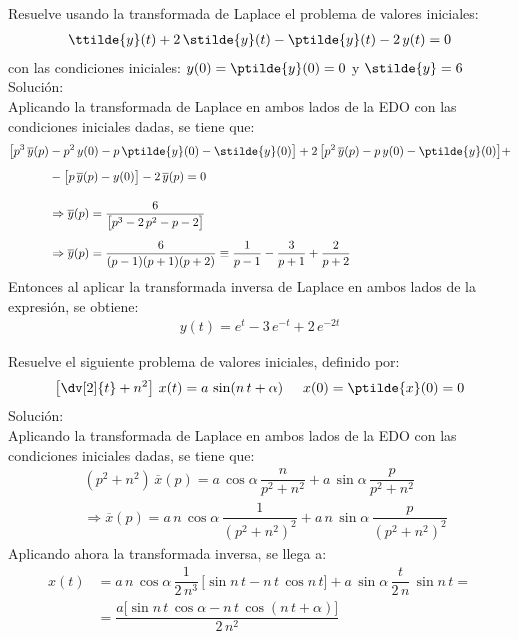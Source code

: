 \begin{ejemplo}
Resuelve usando la transformada de Laplace el problema de valores iniciales:
\begin{align*}
\ttilde{y}(t) +  2 \, \stilde{y} (t) - \ptilde{y}(t) - 2 \, y(t) = 0
\end{align*}
con las condiciones iniciales: $y(0) = \ptilde{y}(0) = 0$ y $\stilde{y} = 6$
\noindent Solución:
\\[0.5em]
Aplicando la transformada de Laplace en ambos lados de la EDO con las condiciones iniciales dadas, se tiene que:
\begin{align*}
\big[p^{3} \, \overline{y}(p) &- p^{2} \, y(0) - p \, \ptilde{y}(0) - \stilde{y}(0) \big] + 2 \, \big[p^{2} \, \overline{y}(p) - p \, y(0) - \ptilde{y}(0) \big] + \\[0.5em]
&- \big[p \, \overline{y}(p) - y(0) \big] - 2 \, \overline{y}(p) = 0 \\[1em]
&\Rightarrow \overline{y}(p) = \dfrac{6}{\big[p^{3} - 2 \, p^{2} - p -2 \big]} \\[0.5em]
&\Rightarrow \overline{y}(p) = \dfrac{6}{(p - 1)(p + 1)(p +2)} \equiv \dfrac{1}{p - 1} - \dfrac{3}{p + 1} + \dfrac{2}{p + 2}  
\end{align*}
Entonces al aplicar la transformada inversa de Laplace en ambos lados de la expresión, se obtiene:
\begin{align*}
y(t) = e^{t} - 3 \, e^{-t} + 2 \, e^{- 2 t}
\end{align*}
\end{ejemplo}
\begin{ejemplo}
Resuelve el siguiente problema de valores iniciales, definido por:
\begin{align*}
\left[ \dv[2]{t} + n^{2}\right] \, x(t) = a \, \sin (n \, t +  \alpha) \hspace{0.5cm} x(0) = \ptilde{x}(0) = 0
\end{align*}
\noindent Solución:
\\[0.5em]
Aplicando la transformada de Laplace en ambos lados de la EDO con las condiciones iniciales dadas, se tiene que:
\begin{align*}
&(p^{2} + n^{2}) \, \overline{x}(p) = a \, \cos \alpha \, \dfrac{n}{p^{2} + n^{2}} +  a \, \sin \alpha \, \dfrac{p}{p^{2} + n^{2}} \\[0.5em]
&\Rightarrow \overline{x}(p) = a \, n \, \cos \alpha \, \dfrac{1}{(p^{2} + n^{2})^{2}} + a \, n \, \sin \alpha \, \dfrac{p}{(p^{2} + n^{2})^{2}}
\end{align*}
Aplicando ahora la transformada inversa, se llega a:
\begin{align*}
x(t) &= a \, n \, \cos \alpha \, \dfrac{1}{2 \, n^{3}} \, \big[\sin n \, t - n \, t \, \cos n \, t \big] + a \, \sin \alpha \, \dfrac{t}{2 \, n} \, \sin n \, t = \\[0.5em]
&= \dfrac{a \big[\sin n \, t \, \cos \alpha - n \, t \, \cos (n \, t +  \alpha)]}{2 \, n^{2}}
\end{align*}
\end{ejemplo}
